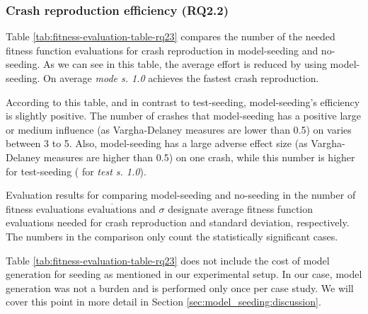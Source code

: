% 	

\subsubsection{Crash reproduction efficiency (\textbf{RQ2.2})}

Table \ref{tab:fitness-evaluation-table-rq23} compares the  number of the needed fitness function evaluations for crash reproduction in model-seeding and no-seeding. As we can see in this table, the average effort is reduced by using model-seeding. On average \textit{mode s. 1.0} achieves the fastest crash reproduction.


According to this table, and in contrast to test-seeding, model-seeding's efficiency is slightly positive. The number of crashes that model-seeding has a positive large or medium influence (as Vargha-Delaney measures are lower than 0.5) on varies between 3 to 5.
Also, model-seeding has a large adverse effect size (as Vargha-Delaney measures are higher than 0.5) on one crash, while this number is higher for test-seeding ( for \textit{test s. 1.0}).
\begin{table} [t]
	\center
	\caption{Evaluation results for comparing model-seeding and no-seeding in the number of fitness evaluations $\overline{\text{evaluations}}$ and $\sigma$  designate average fitness function evaluations needed for crash reproduction and standard deviation, respectively. The numbers in the comparison only count the statistically significant cases.}
	\label{tab:fitness-evaluation-table-rq23}
	\begin{footnotesize}
	
	\end{footnotesize}
\end{table}
Table \ref{tab:fitness-evaluation-table-rq23} does not include the cost of model generation for seeding as mentioned in our experimental setup. In our case, model generation was not a burden and is performed only once per case study. We will cover this point in more detail in Section \ref{sec:model_seeding:discussion}.    




